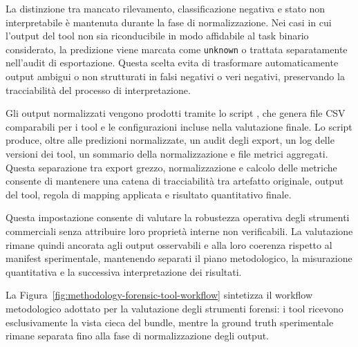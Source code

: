 La distinzione tra mancato rilevamento, classificazione negativa e stato non interpretabile è mantenuta durante la fase di normalizzazione. Nei casi in cui l'output del tool non sia riconducibile in modo affidabile al task binario considerato, la predizione viene marcata come \texttt{unknown} o trattata separatamente nell'audit di esportazione. Questa scelta evita di trasformare automaticamente output ambigui o non strutturati in falsi negativi o veri negativi, preservando la tracciabilità del processo di interpretazione.

Gli output normalizzati vengono prodotti tramite lo script , che genera file CSV comparabili per i tool e le configurazioni incluse nella
valutazione finale. Lo script produce, oltre alle predizioni normalizzate, un audit degli export, un log delle versioni dei tool, un sommario della normalizzazione e file metrici aggregati. Questa separazione tra export grezzo, normalizzazione e calcolo delle metriche consente di mantenere una catena di tracciabilità tra artefatto originale, output del tool, regola di mapping applicata e risultato quantitativo finale.

Questa impostazione consente di valutare la robustezza operativa degli strumenti commerciali senza attribuire loro proprietà interne non verificabili. La valutazione rimane quindi ancorata agli output osservabili e alla loro coerenza rispetto al manifest sperimentale, mantenendo separati il piano metodologico, la misurazione quantitativa e la successiva interpretazione dei risultati.

La Figura~\ref{fig:methodology-forensic-tool-workflow} sintetizza il workflow metodologico adottato per la valutazione degli strumenti forensi: i tool ricevono esclusivamente la vista cieca del bundle, mentre la ground truth sperimentale rimane separata fino alla fase di normalizzazione degli output.

